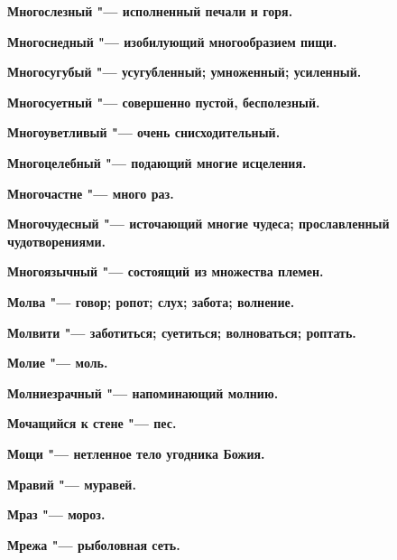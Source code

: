 \begin{mymulticols}{2}
\bfseries Многослезный\normalfont{} "--- исполненный печали и горя. 




\bfseries Многоснедный\normalfont{} "--- изобилующий многообразием пищи. 




\bfseries Многосугубый\normalfont{} "--- усугубленный; умноженный; усиленный. 




\bfseries Многосуетный\normalfont{} "--- совершенно пустой, бесполезный. 




\bfseries Многоуветливый\normalfont{} "--- очень снисходительный. 




\bfseries Многоцелебный\normalfont{} "--- подающий многие исцеления. 




\bfseries Многочастне\normalfont{} "--- много раз. 




\bfseries Многочудесный\normalfont{} "--- источающий многие чудеса; прославленный чудотворениями. 




\bfseries Многоязычный\normalfont{} "--- состоящий из множества племен. 




\bfseries Молва\normalfont{} "--- говор; ропот; слух; забота; волнение. 




\bfseries Молвити\normalfont{} "--- заботиться; суетиться; волноваться; роптать. 




\bfseries Молие\normalfont{} "--- моль. 




\bfseries Молниезрачный\normalfont{} "--- напоминающий молнию. 




\bfseries Мочащийся к стене\normalfont{} "--- пес. 




\bfseries Мощи\normalfont{} "--- нетленное тело угодника Божия. 




\bfseries Мравий\normalfont{} "--- муравей. 




\bfseries Мраз\normalfont{} "--- мороз. 




\bfseries Мрежа\normalfont{} "--- рыболовная сеть. 





\end{mymulticols}
